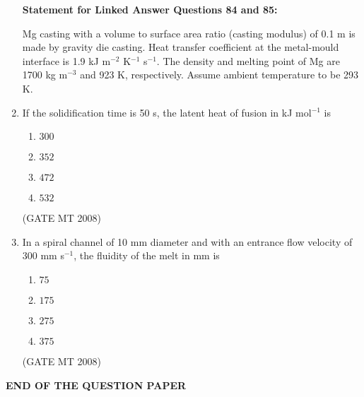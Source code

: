 \documentclass[11pt, letterpaper]{article}
\theoremstyle{remark}
\begin{document}
\begin{enumerate}
\textbf{Statement for Linked Answer Questions 84 and 85:}

Mg casting with a volume to surface area ratio (casting modulus) of 0.1 m is made by gravity die casting.
Heat transfer coefficient at the metal-mould interface is 1.9 kJ m$^{-2}$ K$^{-1}$ s$^{-1}$. 
The density and melting point of Mg are 1700 kg m$^{-3}$ and 923 K, respectively. 
Assume ambient temperature to be 293 K.

\item If the solidification time is 50 s, the latent heat of fusion in kJ mol$^{-1}$ is

\begin{multicols}{4}
\begin{enumerate} 
\item $300$
\item $352$
\item $472$
\item $532$
\end{enumerate}
\end{multicols}

\hfill(GATE MT 2008)

\item In a spiral channel of 10 mm diameter and with an entrance flow velocity of 300 mm s$^{-1}$, the fluidity of the melt in mm is
\vspace{-0.9em}
\begin{multicols}{4}
\begin{enumerate} 
\item $75$
\item $175$
\item $275$
\item $375$
\end{enumerate}
\end{multicols}
\hfill(GATE MT 2008)
\end{enumerate}

\textbf{END OF THE QUESTION PAPER}
\end{document}
